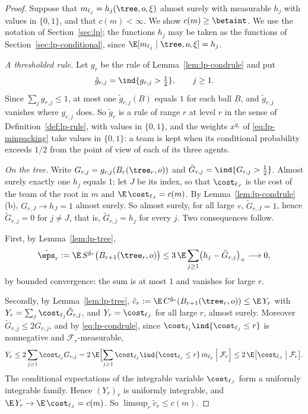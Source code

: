\begin{proof}
Suppose that $m_{\ell_j}=h_j(\tree,o,\xi)$ almost surely with measurable $h_j$ with values in
$\{0,1\}$, and that $c(m)<\infty$. We show $c(m)\ge\betaint$. We use the notation of
Section~\ref{sec:lp}; the functions $h_j$ may be taken as the functions of
Section~\ref{sec:lp-conditional}, since $\E[m_{\ell_j}\mid\tree,o,\xi]=h_j$.

\emph{A thresholded rule.} Let $g_r$ be the rule of Lemma~\ref{lem:lp-condrule} and put
\[
\tilde g_{r,j}=\ind\{g_{r,j}>\tfrac12\},\qquad j\ge1 .
\]
Since $\sum_jg_{r,j}\le1$, at most one $\tilde g_{r,j}(B)$ equals $1$ for each ball $B$, and
$\tilde g_{r,j}$ vanishes where $g_{r,j}$ does. So $\tilde g_r$ is a rule of range $r$ at
level $r$ in the sense of Definition~\ref{def:lp-rule}, with values in $\{0,1\}$, and the
weights $x^{\tilde g_r}$ of \eqref{eq:lp-minpacking} take values in $\{0,1\}$: a team is
kept when its conditional probability exceeds $1/2$ from the point of view of each of its
three agents.

\emph{On the tree.} Write $G_{r,j}=g_{r,j}(B_r(\tree_r,o))$ and
$\tilde G_{r,j}=\ind\{G_{r,j}>\tfrac12\}$. Almost surely exactly one $h_j$ equals $1$; let
$J$ be its index, so that $\cost_{\ell_J}$ is the cost of the team of the root in $m$ and
$\E\,\cost_{\ell_J}=c(m)$. By Lemma~\ref{lem:lp-condrule}(b), $G_{r,J}\to h_J=1$ almost
surely. So almost surely, for all large $r$, $\tilde G_{r,J}=1$, hence $\tilde G_{r,j}=0$
for $j\ne J$, that is, $\tilde G_{r,j}=h_j$ for every $j$. Two consequences follow.

First, by Lemma~\ref{lem:lp-tree},
\[
\tilde\eps_r:=\E\,S^{\tilde g_r}\bigl(B_{r+1}(\tree_r,o)\bigr)
\le3\,\E\sum_{j\ge1}\bigl(h_j-\tilde G_{r,j}\bigr)_+\longrightarrow0,
\]
by bounded convergence: the sum is at most $1$ and vanishes for large $r$.

Secondly, by Lemma~\ref{lem:lp-tree},
$\tilde c_r:=\E\,C^{\tilde g_r}(B_{r+1}(\tree_r,o))\le\E\,Y_r$ with
$Y_r=\sum_j\cost_{\ell_j}\tilde G_{r,j}$, and $Y_r=\cost_{\ell_J}$ for all large $r$, almost
surely. Moreover $\tilde G_{r,j}\le2G_{r,j}$, and by \eqref{eq:lp-condrule}, since
$\cost_{\ell_j}\ind\{\cost_{\ell_j}\le r\}$ is nonnegative and $\mathcal F_r$-measurable,
\[
Y_r\le2\sum_{j\ge1}\cost_{\ell_j}G_{r,j}
=2\,\E\Bigl[\sum_{j\ge1}\cost_{\ell_j}\ind\{\cost_{\ell_j}\le r\}\,m_{\ell_j}\Bigm|
\mathcal F_r\Bigr]\le2\,\E\bigl[\cost_{\ell_J}\bigm|\mathcal F_r\bigr].
\]
The conditional expectations of the integrable variable $\cost_{\ell_J}$ form a uniformly
integrable family. Hence $(Y_r)_r$ is uniformly integrable, and
$\E\,Y_r\to\E\,\cost_{\ell_J}=c(m)$. So $\limsup_r\tilde c_r\le c(m)$.


\end{proof}
